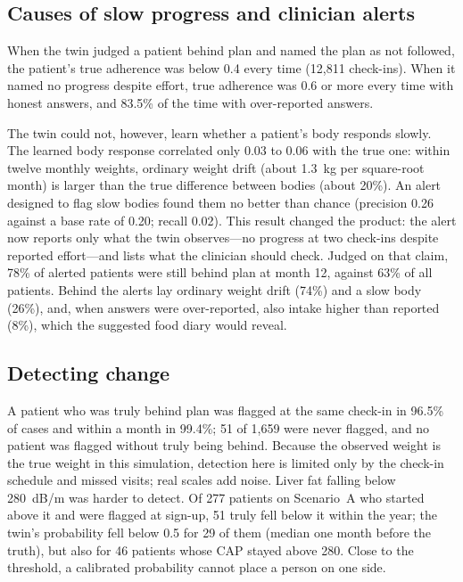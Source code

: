 \subsection{Causes of slow progress and clinician alerts}

When the twin judged a patient behind plan and named the plan as not followed,
the patient's true adherence was below 0.4 every time (12{,}811 check-ins).
When it named no progress despite effort, true adherence was 0.6 or more every
time with honest answers, and 83.5\% of the time with over-reported answers.

The twin could not, however, learn whether a patient's body responds slowly.
The learned body response correlated only 0.03 to 0.06 with the true one:
within twelve monthly weights, ordinary weight drift (about 1.3~kg per
square-root month) is larger than the true difference between bodies (about
20\%). An alert designed to flag slow bodies found them no better than chance
(precision 0.26 against a base rate of 0.20; recall 0.02). This result changed
the product: the alert now reports only what the twin observes---no progress
at two check-ins despite reported effort---and lists what the clinician should
check. Judged on that claim, 78\% of alerted patients were still behind plan at
month 12, against 63\% of all patients. Behind the alerts lay ordinary weight
drift (74\%) and a slow body (26\%), and, when answers were over-reported, also
intake higher than reported (8\%), which the suggested food diary would reveal.

\subsection{Detecting change}

A patient who was truly behind plan was flagged at the same check-in in 96.5\%
of cases and within a month in 99.4\%; 51 of 1{,}659 were never flagged, and
no patient was flagged without truly being behind. Because the observed weight
is the true weight in this simulation, detection here is limited only by the
check-in schedule and missed visits; real scales add noise. Liver fat falling below 280~dB/m was harder to detect. Of 277
patients on Scenario~A who started above it and were flagged at sign-up, 51
truly fell below it within the year; the twin's probability fell below 0.5 for
29 of them (median one month before the truth), but also for 46 patients whose
CAP stayed above 280. Close to the threshold, a calibrated probability cannot
place a person on one side.

